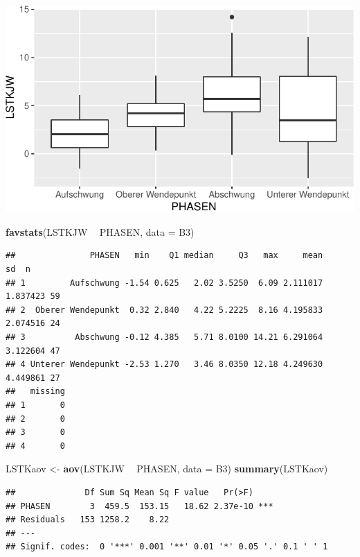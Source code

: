 \documentclass[12pt,ngerman,paper=a4,pagesize,DIV=13]{scrreprt}
\newenvironment{Shaded}{\begin{snugshade}}{\end{snugshade}}
\newcommand{\DataTypeTok}[1]{\textcolor[rgb]{0.13,0.29,0.53}{#1}}
\newcommand{\KeywordTok}[1]{\textcolor[rgb]{0.13,0.29,0.53}{\textbf{#1}}}
\newcommand{\NormalTok}[1]{#1}
\newcommand{\OperatorTok}[1]{\textcolor[rgb]{0.81,0.36,0.00}{\textbf{#1}}}
\newcommand{\StringTok}[1]{\textcolor[rgb]{0.31,0.60,0.02}{#1}}
\begin{document}
\includegraphics{DatenerhebungStatistik-Uebung_files/figure-latex/unnamed-chunk-150-1.pdf}

\begin{Shaded}
\begin{Highlighting}[]
\KeywordTok{favstats}\NormalTok{(LSTKJW }\OperatorTok{~}\StringTok{ }\NormalTok{PHASEN, }\DataTypeTok{data =}\NormalTok{ B3)}
\end{Highlighting}
\end{Shaded}

\begin{verbatim}
##               PHASEN   min    Q1 median     Q3   max     mean       sd  n
## 1         Aufschwung -1.54 0.625   2.02 3.5250  6.09 2.111017 1.837423 59
## 2  Oberer Wendepunkt  0.32 2.840   4.22 5.2225  8.16 4.195833 2.074516 24
## 3          Abschwung -0.12 4.385   5.71 8.0100 14.21 6.291064 3.122604 47
## 4 Unterer Wendepunkt -2.53 1.270   3.46 8.0350 12.18 4.249630 4.449861 27
##   missing
## 1       0
## 2       0
## 3       0
## 4       0
\end{verbatim}

\begin{Shaded}
\begin{Highlighting}[]
\NormalTok{LSTKaov <-}\StringTok{ }\KeywordTok{aov}\NormalTok{(LSTKJW }\OperatorTok{~}\StringTok{ }\NormalTok{PHASEN, }\DataTypeTok{data =}\NormalTok{ B3)}
\KeywordTok{summary}\NormalTok{(LSTKaov)}
\end{Highlighting}
\end{Shaded}

\begin{verbatim}
##              Df Sum Sq Mean Sq F value   Pr(>F)    
## PHASEN        3  459.5  153.15   18.62 2.37e-10 ***
## Residuals   153 1258.2    8.22                     
## ---
## Signif. codes:  0 '***' 0.001 '**' 0.01 '*' 0.05 '.' 0.1 ' ' 1
\end{verbatim}
\end{document}

